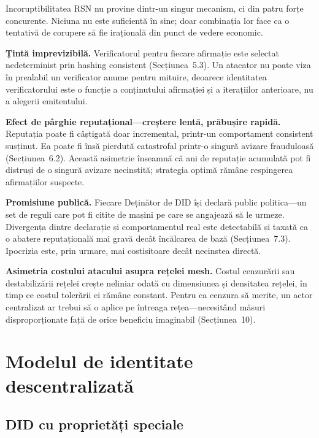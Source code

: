 \documentclass[11pt,a4paper,twocolumn]{article}
\begin{document}
Incoruptibilitatea RSN nu provine dintr-un singur mecanism, ci din patru forțe concurente. Niciuna nu este suficientă în sine; doar combinația lor face ca o tentativă de corupere să fie irațională din punct de vedere economic.

\textbf{Țintă imprevizibilă.} Verificatorul pentru fiecare afirmație este selectat nedeterminist prin hashing consistent (Secțiunea~5.3). Un atacator nu poate viza în prealabil un verificator anume pentru mituire, deoarece identitatea verificatorului este o funcție a conținutului afirmației și a iterațiilor anterioare, nu a alegerii emitentului.

\textbf{Efect de pârghie reputațional---creștere lentă, prăbușire rapidă.} Reputația poate fi câștigată doar incremental, printr-un comportament consistent susținut. Ea poate fi însă pierdută catastrofal printr-o singură avizare frauduloasă (Secțiunea~6.2). Această asimetrie înseamnă că ani de reputație acumulată pot fi distruși de o singură avizare necinstită; strategia optimă rămâne respingerea afirmațiilor suspecte.

\textbf{Promisiune publică.} Fiecare Deținător de DID își declară public politica---un set de reguli care pot fi citite de mașini pe care se angajează să le urmeze. Divergența dintre declarație și comportamentul real este detectabilă și taxată ca o abatere reputațională mai gravă decât încălcarea de bază (Secțiunea~7.3). Ipocrizia este, prin urmare, mai costisitoare decât necinstea directă.

\textbf{Asimetria costului atacului asupra rețelei mesh.} Costul cenzurării sau destabilizării rețelei crește neliniar odată cu dimensiunea și densitatea rețelei, în timp ce costul tolerării ei rămâne constant. Pentru ca cenzura să merite, un actor centralizat ar trebui să o aplice pe întreaga rețea---necesitând măsuri disproporționate față de orice beneficiu imaginabil (Secțiunea~10).

\section{Modelul de identitate descentralizată}

\subsection{DID cu proprietăți speciale}
\end{document}

